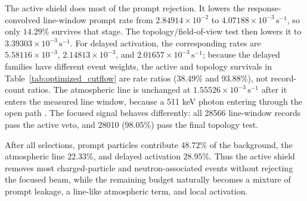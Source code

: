 \documentclass[11pt]{article}
\newcommand{\cps}{\ensuremath{\,\mathrm{s^{-1}}}}
\begin{document}
The active shield does most of the prompt rejection. It lowers the response-convolved
line-window prompt rate from $2.84914\times10^{-2}$ to
$4.07188\times10^{-3}\cps$, so only $14.29\%$ survives that stage. The topology/field-of-view test then lowers
it to $3.39303\times10^{-3}\cps$. For delayed activation, the corresponding
rates are $5.58116\times10^{-3}$, $2.14813\times10^{-3}$, and
$2.01657\times10^{-3}\cps$; because the delayed families have different event
weights, the active and topology survivals in Table~\ref{tab:optimized_cutflow}
are rate ratios (38.49\% and 93.88\%), not record-count ratios. The atmospheric line is unchanged at
$1.55526\times10^{-3}\cps$ after it enters the measured line window, because a 511 keV photon entering through the open
path . The focused signal behaves differently:
all 28566 line-window records pass the active veto, and 28010 ($98.05\%$) pass the
final topology test.

After all selections, prompt particles contribute $48.72\%$ of the background,
the atmospheric line $22.33\%$, and delayed activation $28.95\%$. Thus the active
shield removes most charged-particle and neutron-associated events without
rejecting the focused beam, while the remaining budget naturally becomes a mixture
of prompt leakage, a line-like atmospheric term, and local activation.
\end{document}
